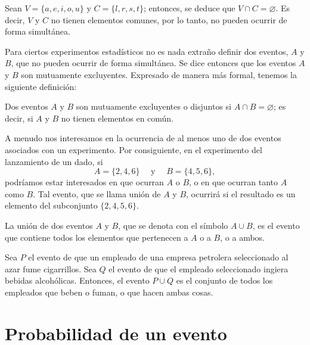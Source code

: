 \begin{examplebox}{}{}
    Sean $V = \{ a, e, i, o, u \}$ y $C = \{l, r, s, t \}$; entonces, se deduce que $V \cap C = \varnothing$. Es decir, $V$ y $C$ no tienen elementos comunes, por lo tanto, no pueden ocurrir de forma simultánea.
\end{examplebox}

Para ciertos experimentos estadísticos no es nada extraño definir dos eventos, $A$ y $B$, que no pueden ocurrir de forma simultánea. Se dice entonces que los eventos $A$ y $B$ son mutuamente excluyentes. Expresado de manera más formal, tenemos la siguiente definición:

\begin{definicion}{}{}
    Dos eventos $A$ y $B$ son mutuamente excluyentes o disjuntos si $A \cap B = \varnothing$; es decir, si $A$ y $B$ no tienen elementos en común.
\end{definicion}

A menudo nos interesamos en la ocurrencia de al menos uno de dos eventos asociados con un experimento. Por consiguiente, en el experimento del lanzamiento de un dado, si
$$A = \{ 2, 4, 6 \} \quad \text{ y } \quad B = \{ 4, 5, 6 \},$$
podríamos estar interesados en que ocurran $A$ o $B$, o en que ocurran tanto $A$ como $B$. Tal evento, que se llama unión de $A$ y $B$, ocurrirá si el resultado es un elemento del subconjunto $\{2, 4, 5, 6\}$.

\begin{definicion}{}{}
    La unión de dos eventos $A$ y $B$, que se denota con el símbolo $A \cup B$, es el evento que contiene todos los elementos que pertenecen a $A$ o a $B$, o a ambos.
\end{definicion}

\begin{examplebox}{}{}
    Sea $P$ el evento de que un empleado de una empresa petrolera seleccionado al azar fume cigarrillos. Sea $Q$ el evento de que el empleado seleccionado ingiera bebidas alcohólicas. Entonces, el evento $P \cup Q$ es el conjunto de todos los empleados que beben o fuman, o que hacen ambas cosas.
\end{examplebox}

\section{Probabilidad de un evento}

